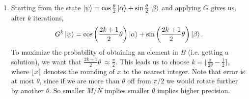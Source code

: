 \begin{enumerate}
    \begin{figure}[h]
    \centering
    \caption{Geometric picture of a single Grover iterate in the plane spanned by $\ket{\alpha}$ and $\ket{\beta}$. The oracle $O_f$ reflects $\ket{\psi}$ across the $\ket{\alpha}$ axis, then the second operator $2\ketbra{\psi}{\psi}-I$ reflects $O_f\ket{\psi}$ across $\ket{\psi}$ axis. The net effect is a final rotation $G\ket{\psi}$, which is now closer to $\ket{\beta}$. Note that the angle $\theta$ has been greatly exaggerated for readability.}
    \label{fig:GroverGeometry}
    \end{figure}
    
    \item Starting from the state $\ket{\psi} = \cos\frac{\theta}{2}\ket{\alpha} + \sin\frac{\theta}{2}\ket{\beta}$ and applying $G$ gives us, after $k$ iterations,
    \[
        G^k\ket{\psi} = \cos\left( \frac{2k+1}{2}\theta\right)\ket{\alpha} + \sin\left( \frac{2k+1}{2}\theta\right)\ket{\beta}.
    \]
    To maximize the probability of obtaining an element in $B$ (i.e. getting a solution), we want that $\frac{2k+1}{2}\theta\ \approx \frac{\pi}{2}$. This leads us to choose $k = \lfloor \frac{\pi}{2\theta} - \frac{1}{2} \rceil$, where $\lfloor x \rceil$ denotes the rounding of $x$ to the nearest integer. Note that error is at most $\theta$, since if we are more than $\theta$ off from $\pi/2$ we would rotate further by another $\theta$. So smaller $M/N$ implies smaller $\theta$ implies higher precision.


\end{enumerate}
